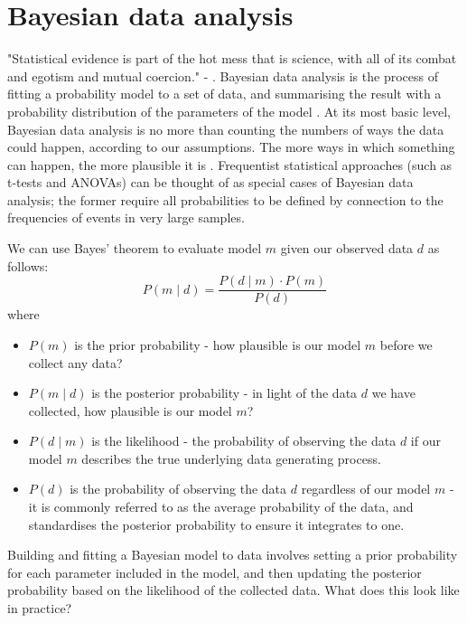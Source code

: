 \section{Bayesian data analysis}
"Statistical evidence is part of the hot mess that is science, with all of its combat and egotism and mutual coercion." - \textcite{mcelreath_statistical_2020}.
Bayesian data analysis is the process of fitting a probability model to a set of data, and summarising the result with a probability distribution of the parameters of the model \cite{gelman_bayesian_2014}.
At its most basic level, Bayesian data analysis is no more than counting the numbers of ways the data could happen, according to our assumptions.
The more ways in which something can happen, the more plausible it is \cite{mcelreath_statistical_2020}.
Frequentist statistical approaches (such as t-tests and ANOVAs) can be thought of as special cases of Bayesian data analysis; the former require all probabilities to be defined by connection to the frequencies of events in very large samples.

We can use Bayes' theorem to evaluate model $m$ given our observed data $d$ as follows:
\begin{equation}\label{eq:bayes_eq_1}
P(m \mid d) = \frac{P(d \mid m) \cdot P(m)}{P(d)}
\end{equation}
where
\begin{itemize}
\item $P(m)$ is the prior probability - how plausible is our model $m$ before we collect any data?
\item $P(m \mid d)$ is the posterior probability - in light of the data $d$ we have collected, how plausible is our model $m$?
\item $P(d \mid m)$ is the likelihood - the probability of observing the data $d$ if our model $m$ describes the true underlying data generating process.
\item $P(d)$ is the probability of observing the data $d$ regardless of our model $m$ - it is commonly referred to as the average probability of the data, and standardises the posterior probability to ensure it integrates to one.
\end{itemize}

Building and fitting a Bayesian model to data involves setting a prior probability for each parameter included in the model, and then updating the posterior probability based on the likelihood of the collected data.
What does this look like in practice?

